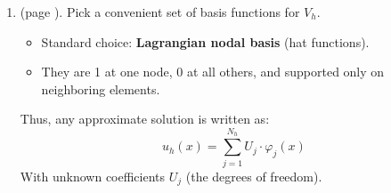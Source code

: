 \begin{enumerate}
    \item {} (page \pageref{def: choose a Lagrangian basis}). Pick a convenient set of basis functions for $V_h$.
    \begin{itemize}
        \item Standard choice: \textbf{Lagrangian nodal basis} (hat functions).
        \item They are 1 at one node, 0 at all others, and supported only on neighboring elements.
    \end{itemize}
    Thus, any approximate solution is written as:
    \begin{equation*}
        u_h(x) = \sum_{j=1}^{N_h} U_j \cdot \varphi_j(x)
    \end{equation*}
    With unknown coefficients $U_j$ (the degrees of freedom).
\end{enumerate}